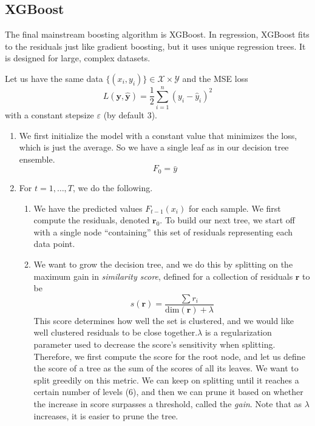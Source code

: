 \subsection{XGBoost} 

  The final mainstream boosting algorithm is XGBoost. In regression, XGBoost fits to the residuals just like gradient boosting, but it uses unique regression trees. It is designed for large, complex datasets. 

  \begin{definition} 
    Let us have the same data $\{(x_i, y_i)\} \in \mathcal{X} \times \mathcal{Y}$ and the MSE loss 
    \begin{equation}
      L(\mathbf{y}, \hat{\mathbf{y}}) = \frac{1}{2} \sum_{i=1}^n (y_i - \hat{y}_i)^2
    \end{equation}
    with a constant stepsize $\varepsilon$ (by default $3$). 

    \begin{enumerate}
      \item We first initialize the model with a constant value that minimizes the loss, which is just the average. So we have a single leaf as in our decision tree ensemble. 
        \begin{equation}
          F_0 = \bar{y}
        \end{equation}

      \item For $t = 1, \ldots, T$, we do the following. 
        \begin{enumerate}
          \item We have the predicted values $F_{t-1}(x_i)$ for each sample. We first compute the residuals, denoted $\mathbf{r}_0$. To build our next tree, we start off with a single node ``containing'' this set of residuals representing each data point. 

          \item We want to grow the decision tree, and we do this by splitting on the maximum gain in \textit{similarity score}, defined for a collection of residuals $\mathbf{r}$ to be 
          \begin{equation}
            s(\mathbf{r}) = \frac{\sum r_i}{\mathrm{dim}(\mathbf{r}) + \lambda}
          \end{equation}
          This score determines how well the set is clustered, and we would like well clustered residuals to be close together.$\lambda$ is a regularization parameter used to decrease the score's sensitivity when splitting. Therefore, we first compute the score for the root node, and let us define the score of a tree as the sum of the scores of all its leaves. We want to split greedily on this metric. We can keep on splitting until it reaches a certain number of levels (6), and then we can prune it based on whether the increase in score surpasses a threshold, called the \textit{gain}. Note that as $\lambda$ increases, it is easier to prune the tree. 


\end{enumerate}
\end{enumerate}
\end{definition}
